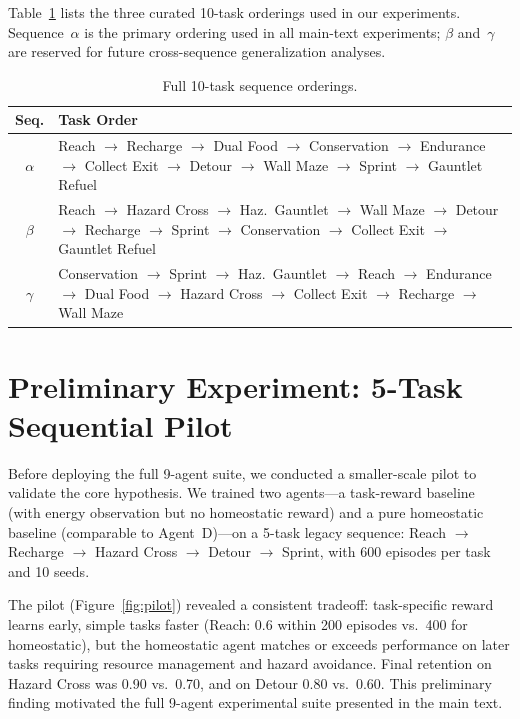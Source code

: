 \documentclass[sigplan,10pt]{acmart}
\begin{document}
Table~\ref{tab:sequences} lists the three curated 10-task orderings used
in our experiments.  Sequence~$\alpha$ is the primary ordering used in
all main-text experiments; $\beta$ and~$\gamma$ are reserved for future
cross-sequence generalization analyses.

\begin{table}[h]
\centering
\caption{Full 10-task sequence orderings.}
\label{tab:sequences}
\begin{tabular}{@{}cp{}@{}}
\toprule
\textbf{Seq.} & \textbf{Task Order} \\
\midrule
$\alpha$ & Reach $\to$ Recharge $\to$ Dual Food $\to$ Conservation $\to$
           Endurance $\to$ Collect Exit $\to$ Detour $\to$ Wall Maze $\to$
           Sprint $\to$ Gauntlet Refuel \\
\midrule
$\beta$  & Reach $\to$ Hazard Cross $\to$ Haz.~Gauntlet $\to$ Wall Maze $\to$
           Detour $\to$ Recharge $\to$ Sprint $\to$ Conservation $\to$
           Collect Exit $\to$ Gauntlet Refuel \\
\midrule
$\gamma$ & Conservation $\to$ Sprint $\to$ Haz.~Gauntlet $\to$ Reach $\to$
           Endurance $\to$ Dual Food $\to$ Hazard Cross $\to$ Collect Exit $\to$
           Recharge $\to$ Wall Maze \\
\bottomrule
\end{tabular}
\end{table}


\section{Preliminary Experiment: 5-Task Sequential Pilot}
\label{app:pilot}

Before deploying the full 9-agent suite, we conducted a smaller-scale
pilot to validate the core hypothesis.  We trained two agents---a
task-reward baseline (with energy observation but no homeostatic reward)
and a pure homeostatic baseline (comparable to Agent~D)---on a 5-task
legacy sequence:
Reach $\to$ Recharge $\to$ Hazard Cross $\to$ Detour $\to$ Sprint, with
600 episodes per task and 10 seeds.

The pilot (Figure~\ref{fig:pilot}) revealed a consistent tradeoff:
task-specific reward learns early, simple tasks faster (Reach: 0.6
within 200 episodes vs.\ 400 for homeostatic), but the homeostatic agent
matches or exceeds performance on later tasks requiring resource
management and hazard avoidance.  Final retention on Hazard Cross was
0.90 vs.\ 0.70, and on Detour 0.80 vs.\ 0.60.  This preliminary finding
motivated the full 9-agent experimental suite presented in the main
text.
\end{document}

